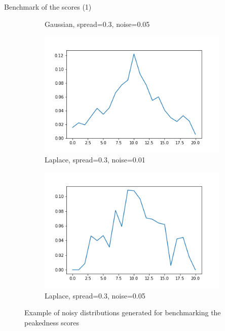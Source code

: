 \documentclass[xcolor=table, hyperref={pdfpagelabels=false}]{beamer}
\begin{document}
\begin{frame}{Benchmark of the scores (1)}
\begin{figure}[H]
\begin{subfigure}{.2\textwidth}
		\caption{Gaussian, spread=0.3, noise=0.05}
	\end{subfigure}
	\begin{subfigure}{.2\textwidth}
		\includegraphics[width=\textwidth]{./images/13-l-5-1.png}
		\caption{Laplace, spread=0.3, noise=0.01}
	\end{subfigure}
	\begin{subfigure}{.2\textwidth}
		\includegraphics[width=\textwidth]{./images/6-l-5-5.png}
		\caption{Laplace, spread=0.3, noise=0.05}
	\end{subfigure}
	\caption{Example of noisy distributions generated for benchmarking the peakedness scores}
\end{figure}
\end{frame}
\end{document}
